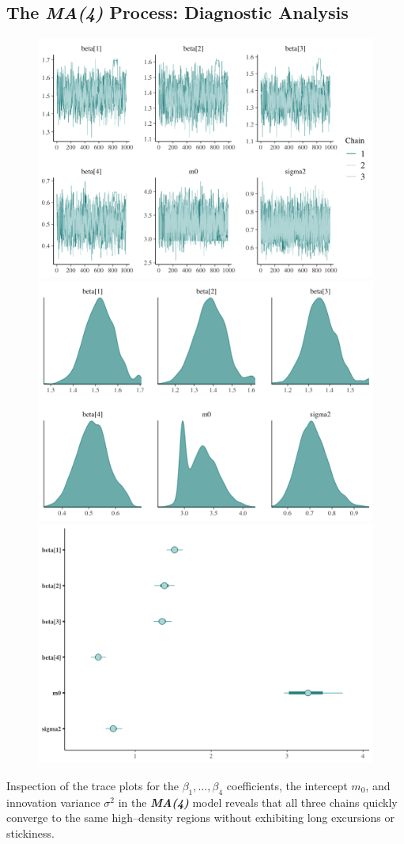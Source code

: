 \documentclass{Configuration_Files/PoliMi3i_thesis}
\begin{document}
\subsection{The \textbf{\textit{MA(4)}} Process: Diagnostic Analysis}
\begin{figure}[H]
    \centering
    \includegraphics[width=0.62\linewidth]{MA(4)-trace.png}
    \vspace{0.5em}
    
    \includegraphics[width=0.62\linewidth]{MA(4)-density.png}
    \vspace{0.5em}
    
    \includegraphics[width=0.62\linewidth]{MA(4)-interval.png}
\end{figure}

Inspection of the trace plots for the \(\beta_1,\dots,\beta_4\) coefficients, the intercept \(m_0\), and innovation variance \(\sigma^2\) in the \textbf{\textit{MA(4)}} model reveals that all three chains quickly converge to the same high–density regions without exhibiting long excursions or stickiness.  
\end{document}
